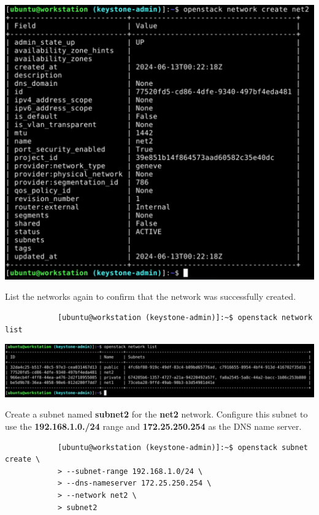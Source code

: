 \documentclass[letterpaper, 12pt]{article}
\begin{document}
\begin{enumerate}
\begin{labstep}
        \begin{center}
            \includegraphics[width=\linewidth]{images/part3/step14.png}
        \end{center}
    \end{labstep}

    \begin{labstep}
        List the networks again to confirm that the network was successfully created.
        \begin{lstlisting}
            [ubuntu@workstation (keystone-admin)]:~$ openstack network list
        \end{lstlisting}

        \begin{center}
            \includegraphics[width=\linewidth]{images/part3/step15.png}
        \end{center}
    \end{labstep}

    \begin{labstep}
        Create a subnet named \textbf{subnet2} for the \textbf{net2} network.
        Configure this subnet to use the \textbf{192.168.1.0./24} range and \textbf{172.25.250.254} as the DNS name server.
        \begin{lstlisting}
            [ubuntu@workstation (keystone-admin)]:~$ openstack subnet create \
            > --subnet-range 192.168.1.0/24 \
            > --dns-nameserver 172.25.250.254 \
            > --network net2 \
            > subnet2
        \end{lstlisting}


\end{labstep}
\end{enumerate}
\end{document}
